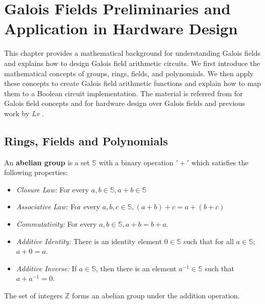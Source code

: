 \chapter{Galois Fields Preliminaries and Application in Hardware Design} \label{ch:prelim}
This chapter provides a mathematical background for understanding 
Galois fields and explains how to design Galois field arithmetic circuits.
We first introduce the mathematical concepts of groups, rings, fields, and 
polynomials. 
We then apply these concepts to create Galois field arithmetic functions and 
explain how to map them to a Boolean circuit implementation.
The material is referred from \cite{galois_field:mceliece} \cite{ftheory:2006} \cite{ff:1997} for Galois field concepts and 
\cite{mastro:1989} \cite{PT:1985} \cite{acar:1998} \cite{wu:2002} \cite{Knezevic:2008} for hardware design over Galois fields and previous work
by {\it Lv} \cite{lv:phd}.


\section{Rings, Fields and Polynomials}

\begin{Definition}
An {\bf abelian group} is a set $\mathbb{S}$ with a binary operation $'+'$
which satisfies the following properties: 
\begin{itemize}
\item {\it Closure Law:} For every $a, b \in \mathbb{S}, a + b \in \mathbb{S}$  
\item {\it Associative Law:} For every $a, b, c \in \mathbb{S}, (a + b) + c = a + (b + c)$
\item {\it Commutativity:} For every $a, b \in \mathbb{S}, a + b = b + a$. 
\item {\it Additive Identity:} There is an identity element $0 \in \mathbb{S}$
such that for all $a \in \mathbb{S};$ $a + 0 = a$.
\item {\it Additive Inverse:} If $a \in \mathbb{S}$, then there is an
element $a^{-1} \in \mathbb{S}$ such that $ a + a^{-1} = 0$.
\end{itemize}
\end{Definition}

The set of integers $\mathbb{Z}$ forms an abelian group under the addition operation. 

